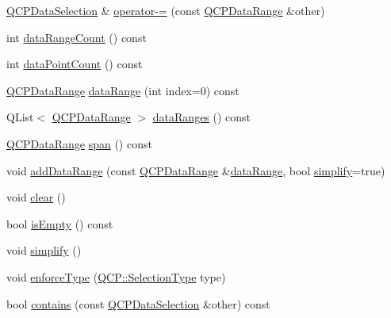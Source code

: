 \begin{DoxyCompactItemize}
\item 
\mbox{\hyperlink{class_q_c_p_data_selection}{Q\+C\+P\+Data\+Selection}} \& \mbox{\hyperlink{class_q_c_p_data_selection_a8d18b20d20dde737eefc10967e31cf73}{operator-\/=}} (const \mbox{\hyperlink{class_q_c_p_data_range}{Q\+C\+P\+Data\+Range}} \&other)
\item 
int \mbox{\hyperlink{class_q_c_p_data_selection_abd8869ccb231ab991e8576de931f647d}{data\+Range\+Count}} () const
\item 
int \mbox{\hyperlink{class_q_c_p_data_selection_ac9e74dd294778aa799216c3435c9c4f0}{data\+Point\+Count}} () const
\item 
\mbox{\hyperlink{class_q_c_p_data_range}{Q\+C\+P\+Data\+Range}} \mbox{\hyperlink{class_q_c_p_data_selection_a6956acf6a9a49a353b4f9b58608978ad}{data\+Range}} (int index=0) const
\item 
Q\+List$<$ \mbox{\hyperlink{class_q_c_p_data_range}{Q\+C\+P\+Data\+Range}} $>$ \mbox{\hyperlink{class_q_c_p_data_selection_ac3b1c5e7713d380cd9e447f4556b94da}{data\+Ranges}} () const
\item 
\mbox{\hyperlink{class_q_c_p_data_range}{Q\+C\+P\+Data\+Range}} \mbox{\hyperlink{class_q_c_p_data_selection_a890f9291e0b7f065747040de5d68ff7d}{span}} () const
\item 
void \mbox{\hyperlink{class_q_c_p_data_selection_a46740c5aa7b80ae9b2abf6985d61b74f}{add\+Data\+Range}} (const \mbox{\hyperlink{class_q_c_p_data_range}{Q\+C\+P\+Data\+Range}} \&\mbox{\hyperlink{class_q_c_p_data_selection_a6956acf6a9a49a353b4f9b58608978ad}{data\+Range}}, bool \mbox{\hyperlink{class_q_c_p_data_selection_a4a2fbad1a6e4d1dd26fdfdf88956f2a4}{simplify}}=true)
\item 
void \mbox{\hyperlink{class_q_c_p_data_selection_a385dd665e6690d39afb8bbd727b1e00b}{clear}} ()
\item 
bool \mbox{\hyperlink{class_q_c_p_data_selection_a7f7526b475998dc0c3d6c376b24736c9}{is\+Empty}} () const
\item 
void \mbox{\hyperlink{class_q_c_p_data_selection_a4a2fbad1a6e4d1dd26fdfdf88956f2a4}{simplify}} ()
\item 
void \mbox{\hyperlink{class_q_c_p_data_selection_a17b84d852911531d229f4a76aa239a75}{enforce\+Type}} (\mbox{\hyperlink{namespace_q_c_p_ac6cb9db26a564b27feda362a438db038}{Q\+C\+P\+::\+Selection\+Type}} type)
\item 
bool \mbox{\hyperlink{class_q_c_p_data_selection_ab1ad3d5bbb55749c3f7ab1e45429c932}{contains}} (const \mbox{\hyperlink{class_q_c_p_data_selection}{Q\+C\+P\+Data\+Selection}} \&other) const

\end{DoxyCompactItemize}
